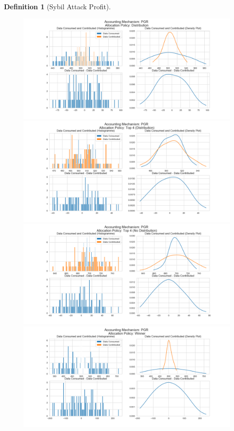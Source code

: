 \documentclass[11pt,a4paper]{report}
\theoremstyle{definition}
\newtheorem{definition}{Definition}[section]
\theoremstyle{theorem}
\theoremstyle{proposition}
\theoremstyle{corollary}
\theoremstyle{lemma}
\theoremstyle{example}
\theoremstyle{remark}
\begin{document}
\begin{definition}[Sybil Attack Profit]
\begin{figure}[H]
\begin{center}
\includegraphics[scale=0.4]{Acc_PGR_Dist.png}
\includegraphics[scale=0.4]{Acc_PGR_Top_4_Dist.png}
\includegraphics[scale=0.4]{Acc_PGR_Top_4_No_Dist.png}
\includegraphics[scale=0.4]{Acc_PGR_Winner.png}
\end{center}
\end{figure}


\end{definition}
\end{document}
